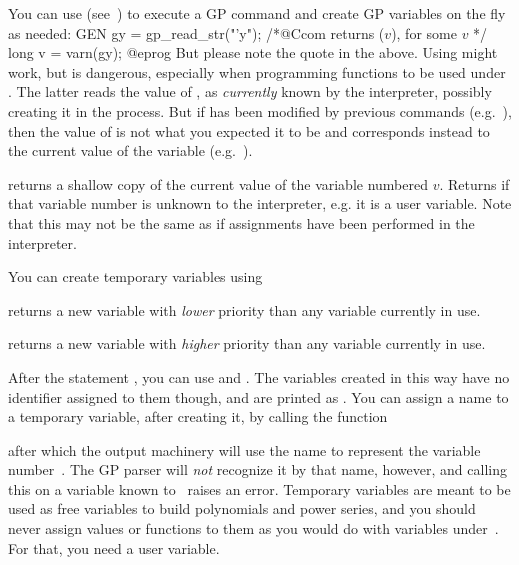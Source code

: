  You can use 
(see~) to execute a GP command and create GP
variables on the fly as needed:
\bprog
GEN gy = gp_read_str("'y"); /*@Ccom returns ($v$), for some $v$ */
long v = varn(gy);
@eprog\noindent
But please note the quote  in the above. Using 
might work, but is dangerous, especially when programming functions to
be used under . The latter reads the value of , as
\emph{currently} known by the  interpreter, possibly creating it
in the process. But if  has been modified by previous 
commands (e.g.~), then the value of  is not what you
expected it to be and corresponds instead to the current value of the
 variable (e.g.~).

 returns a shallow copy of the current
value of the variable numbered $v$. Returns  if that variable
number is unknown to the interpreter,  e.g. it is a user variable. Note
that this may not be the same as  if assignments have been
performed in the interpreter.

You can create temporary variables using

returns a new variable with \emph{lower} priority than any variable currently
in use.

returns a new variable with \emph{higher} priority than any variable
currently in use.

\noindent
After the statement , you can use
 and . The variables created in this way have no
identifier assigned to them though, and are printed as
. You can assign a name to a temporary variable, after
creating it, by calling the function


\noindent after which the output machinery will use the name  to
represent the variable number~. The GP parser will \emph{not}
recognize it by that name, however, and calling this on a variable known
to~ raises an error. Temporary variables are meant to be used as free
variables to build polynomials and power series, and you should never assign
values or functions to them as you would do with variables under~.
For that, you need a user variable.

